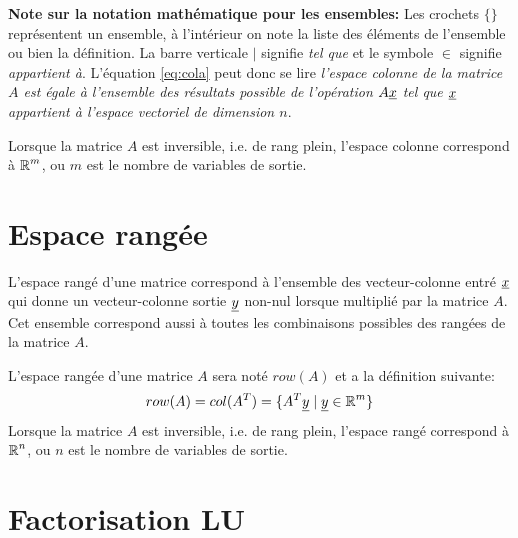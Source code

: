 \textbf{Note sur la notation mathématique pour les ensembles:} Les crochets $\{ \}$ représentent un ensemble, à l'intérieur on note la liste des éléments de l'ensemble ou bien la définition. La barre verticale $|$ signifie \textit{tel que} et le symbole $\in$ signifie \textit{appartient à}. L'équation \eqref{eq:cola} peut donc se lire \textit{l'espace colonne de la matrice $A$ est égale à l'ensemble des résultats possible de l'opération $A \underline{x} $ tel que $\underline{x}$ appartient à l'espace vectoriel de dimension $n$}.

Lorsque la matrice $A$ est inversible, i.e. de rang plein, l'espace colonne correspond à $\operatorname{\mathbb{R}}^m$, ou $m$ est le nombre de variables de sortie.

\section{Espace rangée}
\label{sec:esprow}

L'espace rangé d'une matrice correspond à l'ensemble des vecteur-colonne entré $\underline{x}$ qui donne un vecteur-colonne sortie $\underline{y}$ non-nul lorsque multiplié par la matrice $A$. Cet ensemble correspond aussi à toutes les combinaisons possibles des rangées de la matrice $A$.


L'espace rangée d'une matrice $A$ sera noté $row(A)$ et a la définition suivante:
\begin{align}
row(A) =  col(A^T) = 
\{ A^T \underline{y} \; | \; \underline{y} \in \operatorname{\mathbb{R}}^m \}
\end{align}
Lorsque la matrice $A$ est inversible, i.e. de rang plein, l'espace rangé correspond à $\operatorname{\mathbb{R}}^n$, ou $n$ est le nombre de variables de sortie.

\section{Factorisation LU}
\label{sec:lu}

